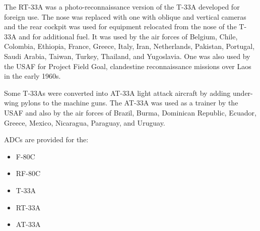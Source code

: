 The RT-33A was a photo-reconnaissance version of the T-33A developed for foreign use. The nose was replaced with one with oblique and vertical cameras and the rear cockpit was used for equipment relocated from the nose of the T-33A and for additional fuel. It was used by the air forces of Belgium, Chile, Colombia, Ethiopia, France, Greece, Italy, Iran, Netherlands, Pakistan, Portugal, Saudi Arabia, Taiwan, Turkey, Thailand, and Yugoslavia. One was also used by the USAF for Project Field Goal, clandestine reconnaissance missions over Laos in the early 1960s.

Some T-33As were converted into AT-33A light attack aircraft by adding under-wing pylons to the machine guns. The AT-33A was used as a trainer by the USAF and also by the air forces of Brazil, Burma, Dominican Republic, Ecuador, Greece, Mexico, Nicaragua, Paraguay, and Uruguay.

ADCs are provided for the:
\begin{itemize}
\item F-80C
\item RF-80C
\item T-33A
\item RT-33A
\item AT-33A
\end{itemize}
